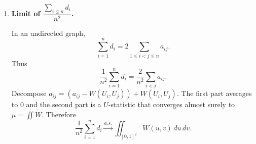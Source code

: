 \documentclass[11pt]{article}
\begin{document}
\begin{enumerate}[label=(\alph*)]
\medskip
\noindent
\textbf{CLT (conditional).} For fixed $u$, if $d_1\mid U_1=u\sim \mathrm{Bin}(n-1,g(u))$, then
\[
\frac{d_1-(n-1)g(u)}{\sqrt{(n-1)g(u)(1-g(u))}}
\xrightarrow{d} \mathcal N(0,1).
\]
Equivalently, conditioning on $U_1$,
\[
\sqrt{n}\left(\frac{d_1}{n}-g(U_1)\right)\ \Big|\ U_1
\ \xrightarrow{d}\ \mathcal N\!\left(0,\ g(U_1)(1-g(U_1))\right).
\]
Unconditionally this yields a mixture of normals (variance depends on the random $U_1$).

\item \textbf{Limit of $\dfrac{\sum_{i\le n} d_i}{n^2}$.}

In an undirected graph,
\[
\sum_{i=1}^n d_i = 2\sum_{1\le i<j\le n} a_{ij}.
\]
Thus
\[
\frac{1}{n^2}\sum_{i=1}^n d_i
= \frac{2}{n^2}\sum_{i<j} a_{ij}.
\]
Decompose $a_{ij}=(a_{ij}-W(U_i,U_j))+W(U_i,U_j)$. The first part averages to $0$ and the second part is a $U$-statistic that converges almost surely to $\mu=\iint W$. Therefore
\[
\frac{1}{n^2}\sum_{i=1}^n d_i \xrightarrow{a.s.} \iint_{[0,1]^2} W(u,v)\,du\,dv.
\]
\end{enumerate}
\end{document}

